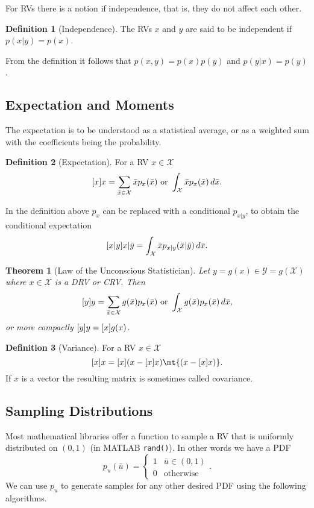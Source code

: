 \documentclass[margin=small]{hsrzf}
\makeatletter
\let\ost@expectation\relax \let\ost@variance\relax
\let\E\relax \let\Var\relax
\DeclareMathOperator*{\ost@expectation}{E}
\newcommand*{\E}[2][]{\ost@expectation_{#1}\left\{#2\right\}}
\DeclareMathOperator*{\ost@variance}{Var}
\newcommand*{\Var}[2][]{\ost@variance_{#1}\left\{#2\right\}}
\theoremstyle{plain}
\newtheorem{thm}{Theorem}[section]
\theoremstyle{definition}
\newtheorem{defn}{Definition}[section]
\theoremstyle{remark}
\makeatother
\begin{document}
For RVs there is a notion if independence, that is, they do not affect each
other.

\begin{defn}[Independence]
  The RVs $x$ and $y$ are said to be independent if $p(x|y) = p(x)$.
\end{defn}

From the definition it follows that $p(x,y) = p(x)p(y)$ and $p(y|x) = p(y)$.

\subsection{Expectation and Moments}

The expectation is to be understood as a statistical average, or as a weighted
sum with the coefficients being the probability.

\begin{defn}[Expectation]
  For a RV $x \in \mathcal{X}$
  \[
    \E[x]{x}
       = \sum_{\bar{x} \in \mathcal{X}} \bar{x} p_x(\bar{x})
       \text{ or }
       \int_\mathcal{X} \bar{x} p_x(\bar{x}) \, d\bar{x}.
  \]
\end{defn}

In the definition above $p_x$ can be replaced with a conditional $p_{x|y}$, to
obtain the conditional expectation
\[
  \E[x|y]{x | \bar{y}} 
    = \int_\mathcal{X} \bar{x} p_{x|y}(\bar{x} | \bar{y}) \, d\bar{x}.
\]

\begin{thm}[Law of the Unconscious Statistician]
  Let $y = g(x) \in \mathcal{Y} = g(\mathcal{X})$ where $x \in \mathcal{X}$ is
  a DRV or CRV. Then
  \[
    \E[y]{y} = \sum_{\bar{x} \in \mathcal{X}} g(\bar{x}) p_x(\bar{x})
      \text{ or }
      \int_\mathcal{X} g(\bar{x}) p_x(\bar{x}) \, d\bar{x},
  \]
  or more compactly $\E[y]{y} = \E[x]{g(x)}$.
\end{thm}

\begin{defn}[Variance]
  For a RV $x \in \mathcal{X}$
  \[
    \Var[x]{x} = \E[x]{(x - \E[x]{x})\mt{(x - \E[x]{x})}}.
  \]
  If $x$ is a vector the resulting matrix is sometimes called covariance.
\end{defn}

\subsection{Sampling Distributions}

Most mathematical libraries offer a function to sample a RV that is uniformly
distributed on $(0,1)$ (in MATLAB \texttt{rand()}). In other words we have a
PDF
\[
  p_u(\bar{u}) = \begin{cases}
    1 & \bar{u} \in (0,1) \\
    0 & \text{otherwise}
  \end{cases}.
\]
We can use $p_u$ to generate samples for any other desired PDF using the
following algorithms.
\end{document}
